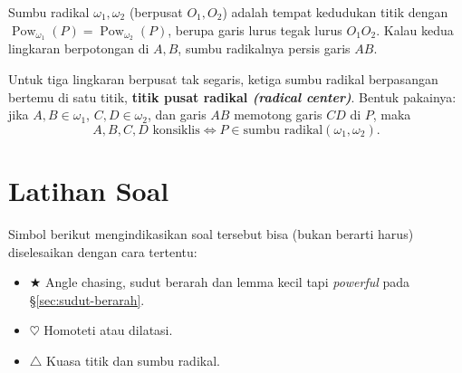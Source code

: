 \documentclass[letterpaper, 13pt]{scrartcl}
\newcommand{\titik}[1]{\foreach \p in {#1} \filldraw (\p) circle (1.4pt);}
\begin{document}
\noindent
\begin{minipage}[t]{210pt}
\vspace{0pt}
\centering
{}
\end{minipage}\hfill
\begin{minipage}[t]{\dimexpr\textwidth-210pt-16pt\relax}
\vspace{0pt}
Sumbu radikal $\omega_1, \omega_2$ (berpusat $O_1, O_2$) adalah tempat kedudukan titik dengan $\operatorname{Pow}_{\omega_1}(P) = \operatorname{Pow}_{\omega_2}(P)$, berupa garis lurus tegak lurus $O_1O_2$. Kalau kedua lingkaran berpotongan di $A, B$, sumbu radikalnya persis garis $AB$.
\end{minipage}
\par\bigskip


Untuk tiga lingkaran berpusat tak segaris, ketiga sumbu radikal berpasangan bertemu di satu titik, \textbf{titik pusat radikal \textit{(radical center)}}. Bentuk pakainya: jika $A, B \in \omega_1$, $C, D \in \omega_2$, dan garis $AB$ memotong garis $CD$ di $P$, maka
\[
A, B, C, D \text{ konsiklis} \iff P \in \text{sumbu radikal}(\omega_1, \omega_2).
\]

\newpage
\section{Latihan Soal}
Simbol berikut mengindikasikan soal tersebut bisa (bukan berarti harus) diselesaikan dengan cara tertentu:
\begin{itemize}
  \item $\bigstar$ \quad Angle chasing, sudut berarah dan lemma kecil tapi \textit{powerful} pada \S\ref{sec:sudut-berarah}.
  \item $\heartsuit$ \quad Homoteti atau dilatasi.
  \item $\triangle$ \quad Kuasa titik dan sumbu radikal.
\end{itemize}
\end{document}
